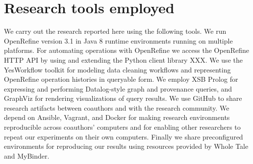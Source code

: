 \section{Research tools employed}

We carry out the research reported here using the following tools. We run OpenRefine version 3.1 in Java 8 runtime environments running on multiple platforms. For automating operations with OpenRefine we access the OpenRefine HTTP API by using and extending the Python client library XXX.  We use the YesWorkflow toolkit for modeling data cleaning workflows and representing OpenRefine operation histories in queryable form. We employ XSB Prolog for expressing and performing Datalog-style graph and provenance queries, and GraphViz for rendering visualizations of query results. We use GitHub to share research artifacts between coauthors and with the research community. We depend on Ansible, Vagrant, and Docker for making research environments reproducible across coauthors' computers and for enabling other researchers to repeat our experiments on their own computers. Finally we share preconfigured environments for reproducing our results using resources provided by Whole Tale and MyBinder.

